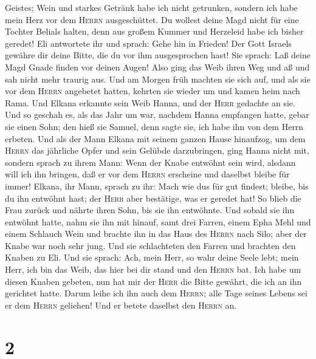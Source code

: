 Geistes; Wein und starkes Getränk habe ich nicht getrunken, sondern ich
habe mein Herz vor dem \textsc{Herrn} ausgeschüttet.  Du
wollest deine Magd nicht für eine Tochter Belials halten, denn aus
großem Kummer und Herzeleid habe ich bisher geredet!  Eli
antwortete ihr und sprach: Gehe hin in Frieden! Der Gott Israels gewähre
dir deine Bitte, die du vor ihm ausgesprochen hast!  Sie
sprach: Laß deine Magd Gnade finden vor deinen Augen! Also ging das Weib
ihren Weg und aß und sah nicht mehr traurig aus.  Und am
Morgen früh machten sie sich auf, und als sie vor dem \textsc{Herrn}
angebetet hatten, kehrten sie wieder um und kamen heim nach Rama. Und
Elkana erkannte sein Weib Hanna, und der \textsc{Herr} gedachte an sie.
 Und so geschah es, als das Jahr um war, nachdem Hanna
empfangen hatte, gebar sie einen Sohn; den hieß sie Samuel, denn sagte
sie, ich habe ihn von dem Herrn erbeten.  Und als der
Mann Elkana mit seinem ganzen Hause hinaufzog, um dem \textsc{Herrn} das
jährliche Opfer und sein Gelübde darzubringen,  ging
Hanna nicht mit, sondern sprach zu ihrem Mann: Wenn der Knabe entwöhnt
sein wird, alsdann will ich ihn bringen, daß er vor dem \textsc{Herrn}
erscheine und daselbst bleibe für immer!  Elkana, ihr
Mann, sprach zu ihr: Mach wie du\textquotesingle s für gut findest;
bleibe, bis du ihn entwöhnt hast; der \textsc{Herr} aber bestätige, was
er geredet hat! So blieb die Frau zurück und nährte ihren Sohn, bis sie
ihn entwöhnte.  Und sobald sie ihn entwöhnt hatte, nahm
sie ihn mit hinauf, samt drei Farren, einem Epha Mehl und einem Schlauch
Wein und brachte ihn in das Haus des \textsc{Herrn} nach Silo; aber der
Knabe war noch sehr jung.  Und sie schlachteten den
Farren und brachten den Knaben zu Eli.  Und sie sprach:
Ach, mein Herr, so wahr deine Seele lebt; mein Herr, ich bin das Weib,
das hier bei dir stand und den \textsc{Herrn} bat.  Ich
habe um diesen Knaben gebeten, nun hat mir der \textsc{Herr} die Bitte
gewährt, die ich an ihn gerichtet hatte.  Darum leihe ich
ihn auch dem \textsc{Herrn}; alle Tage seines Lebens sei er dem
\textsc{Herrn} geliehen! Und er betete daselbst den \textsc{Herrn} an.

\hypertarget{section-1}{%
\section{2}\label{section-1}}

